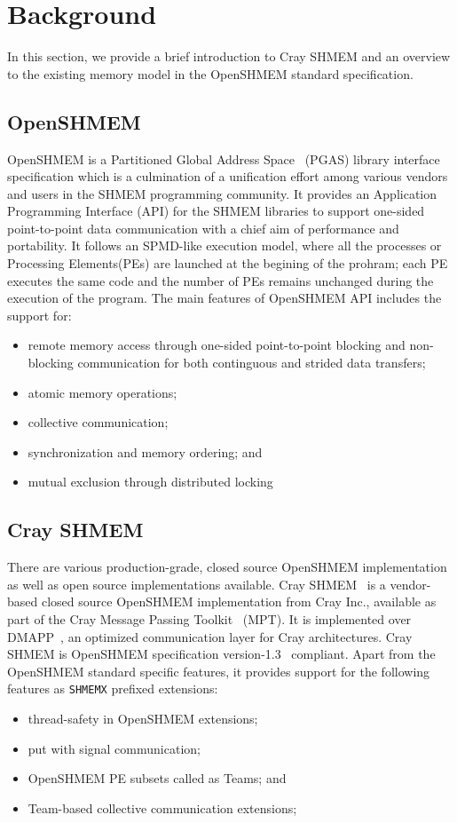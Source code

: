 \section{Background}
\label{src:bground}

In this section, we provide a brief introduction to Cray SHMEM and an
overview to the existing memory model in the OpenSHMEM standard
specification.

\subsection{OpenSHMEM}
\label{src:bg/osm}
OpenSHMEM is a Partitioned Global Address Space~\cite{pgas} (PGAS) library
interface specification which is a culmination of a unification effort
among various vendors and users in the SHMEM programming community. It
provides an Application Programming Interface (API) for the SHMEM libraries
to support one-sided point-to-point data communication with a chief aim of
performance and portability. It follows an SPMD-like execution model, where
all the processes or Processing Elements(PEs) are launched at the begining
of the prohram; each PE executes the same code and the number of PEs remains
unchanged during the execution of the program. The main features of OpenSHMEM
API includes the support for:
\begin{itemize}
    \item remote memory access through one-sided point-to-point blocking and
    non-blocking communication for both continguous and strided data transfers;
    \item atomic memory operations;
    \item collective communication;
    \item synchronization and memory ordering; and
    \item mutual exclusion through distributed locking
\end{itemize}

\subsection{Cray SHMEM}
\label{src:bg/crayshmem}
There are various production-grade, closed source OpenSHMEM implementation as well
as open source implementations available. Cray SHMEM~\cite{csma} is a vendor-based
closed source OpenSHMEM implementation from Cray Inc., available as part of the Cray
Message Passing Toolkit~\cite{mpt} (MPT). It is implemented over DMAPP~\cite{dmapp},
an optimized communication layer for Cray architectures. Cray SHMEM is OpenSHMEM
specification version-1.3~\cite{osm13} compliant. Apart from the OpenSHMEM standard
specific features, it provides support for the following features as \texttt{SHMEMX}
prefixed extensions:
\begin{itemize}
    \item thread-safety in OpenSHMEM extensions;
    \item put with signal communication;
    \item OpenSHMEM PE subsets called as Teams; and
    \item Team-based collective communication extensions;
\end{itemize}

